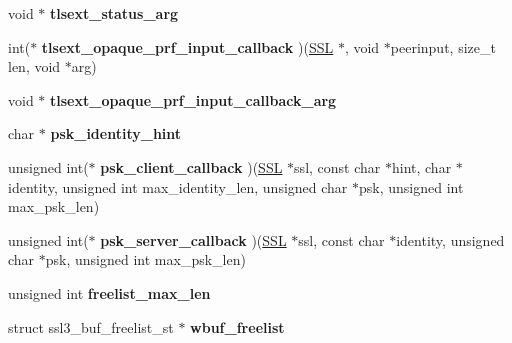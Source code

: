 \begin{DoxyCompactItemize}
\item 
\hypertarget{structssl__ctx__st_a34c025b8e62d9ade63d51808d9271192}{}void $\ast$ {\bfseries tlsext\+\_\+status\+\_\+arg}\label{structssl__ctx__st_a34c025b8e62d9ade63d51808d9271192}

\item 
\hypertarget{structssl__ctx__st_a93fda87cb1a383657cbc973886b5a4c7}{}int($\ast$ {\bfseries tlsext\+\_\+opaque\+\_\+prf\+\_\+input\+\_\+callback} )(\hyperlink{structssl__st}{S\+S\+L} $\ast$, void $\ast$peerinput, size\+\_\+t len, void $\ast$arg)\label{structssl__ctx__st_a93fda87cb1a383657cbc973886b5a4c7}

\item 
\hypertarget{structssl__ctx__st_a256ac8f414a4bbf80a5ee4ca1f2df89c}{}void $\ast$ {\bfseries tlsext\+\_\+opaque\+\_\+prf\+\_\+input\+\_\+callback\+\_\+arg}\label{structssl__ctx__st_a256ac8f414a4bbf80a5ee4ca1f2df89c}

\item 
\hypertarget{structssl__ctx__st_a8834b3e8d91529f7339f8648d20a884b}{}char $\ast$ {\bfseries psk\+\_\+identity\+\_\+hint}\label{structssl__ctx__st_a8834b3e8d91529f7339f8648d20a884b}

\item 
\hypertarget{structssl__ctx__st_aea631f9715f6e5af8ba0194353782229}{}unsigned int($\ast$ {\bfseries psk\+\_\+client\+\_\+callback} )(\hyperlink{structssl__st}{S\+S\+L} $\ast$ssl, const char $\ast$hint, char $\ast$identity, unsigned int max\+\_\+identity\+\_\+len, unsigned char $\ast$psk, unsigned int max\+\_\+psk\+\_\+len)\label{structssl__ctx__st_aea631f9715f6e5af8ba0194353782229}

\item 
\hypertarget{structssl__ctx__st_a2102c8eaff09b0b5d9e1d89e8c4d27dc}{}unsigned int($\ast$ {\bfseries psk\+\_\+server\+\_\+callback} )(\hyperlink{structssl__st}{S\+S\+L} $\ast$ssl, const char $\ast$identity, unsigned char $\ast$psk, unsigned int max\+\_\+psk\+\_\+len)\label{structssl__ctx__st_a2102c8eaff09b0b5d9e1d89e8c4d27dc}

\item 
\hypertarget{structssl__ctx__st_ac7e703cc2f4d778d8c27cae612975ddb}{}unsigned int {\bfseries freelist\+\_\+max\+\_\+len}\label{structssl__ctx__st_ac7e703cc2f4d778d8c27cae612975ddb}

\item 
\hypertarget{structssl__ctx__st_a523c86950f05f20b48fa4e21b39f216f}{}struct ssl3\+\_\+buf\+\_\+freelist\+\_\+st $\ast$ {\bfseries wbuf\+\_\+freelist}\label{structssl__ctx__st_a523c86950f05f20b48fa4e21b39f216f}


\end{DoxyCompactItemize}
